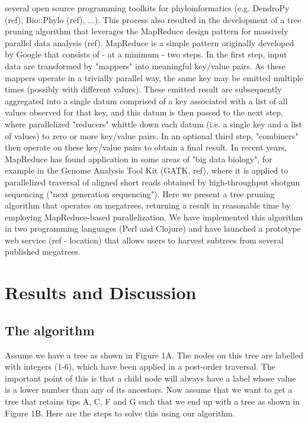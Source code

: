 \documentclass[10pt]{bmc_article}
\newenvironment{bmcformat}{\begin{raggedright}\baselineskip20pt\sloppy\setboolean{publ}{false}}{\end{raggedright}\baselineskip20pt\sloppy}
\begin{document}
\begin{bmcformat}
several open source programming toolkits for phyloinformatics (e.g. DendroPy (ref),
Bio::Phylo (ref), ...). This process also resulted in the development of a tree
pruning algorithm that leverages the MapReduce design pattern for massively 
parallel data analysis (ref). MapReduce is a simple pattern originally developed
by Google that consists of - at a minimum - two steps. In the first step, input
data are transformed by "mappers" into meaningful key/value pairs. As these 
mappers operate in a trivially parallel way, the same key may be emitted multiple 
times (possibly with different values). These emitted result are subsequently 
aggregated into a single datum comprised of a key associated with a list of 
all values observed for that key, and this datum is then passed to the next
step, where parallelized "reducers" whittle down each datum (i.e. a single key
and a list of values) to zero or more key/value pairs. In an optional third
step, "combiners" then operate on these key/value pairs to obtain a final result.
In recent years, MapReduce has found application in some areas of "big data
biology", for example in the Genome Analysis Tool Kit (GATK, ref), where it is
applied to parallelized traversal of aligned short reads obtained by high-throughput
shotgun sequencing ("next generation sequencing"). Here we present a tree pruning
algorithm that operates on megatrees, returning a result in reasonable time by
employing MapReduce-based parallelization. We have implemented this algorithm in
two programming languages (Perl and Clojure) and have launched a prototype web
service (ref - location) that allows users to harvest subtrees from several 
published megatrees.

\section*{Results and Discussion}

  \subsection*{The algorithm}
	Assume we have a tree as shown in Figure 1A. The nodes on this tree are 
	labelled with integers (1-6), which have been applied in a post-order 
	traversal. The important point of this is that a child node will always 
	have a label whose value is a lower number than any of its ancestors. Now
	assume that we want to get a tree that retains tips A, C, F and G such
	that we end up with a tree as shown in Figure 1B. Here are the steps to
	solve this using our algorithm.

\end{bmcformat}
\end{document}
